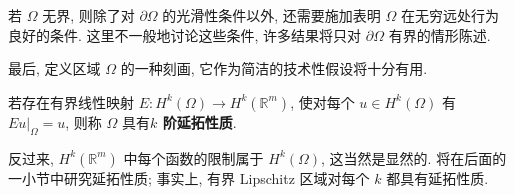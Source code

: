 若 $\Omega$ 无界, 则除了对 $\partial\Omega$ 的光滑性条件以外, 还需要施加表明 $\Omega$ 在无穷远处行为良好的条件. 这里不一般地讨论这些条件, 许多结果将只对 $\partial\Omega$ 有界的情形陈述.

最后, 定义区域 $\Omega$ 的一种刻画, 它作为简洁的技术性假设将十分有用.

\begin{Definition}
\label{def:sobolev-k-extension-property}
若存在有界线性映射 $E:H^k(\Omega)\to H^k(\mathbb{R}^m)$, 使对每个 $u\in H^k(\Omega)$ 有 $Eu|_{\Omega}=u$, 则称 $\Omega$ 具有\textbf{$k$ 阶延拓性质}.
\end{Definition}

反过来, $H^k(\mathbb{R}^m)$ 中每个函数的限制属于 $H^k(\Omega)$, 这当然是显然的. 将在后面的一小节中研究延拓性质; 事实上, 有界 Lipschitz 区域对每个 $k$ 都具有延拓性质.

